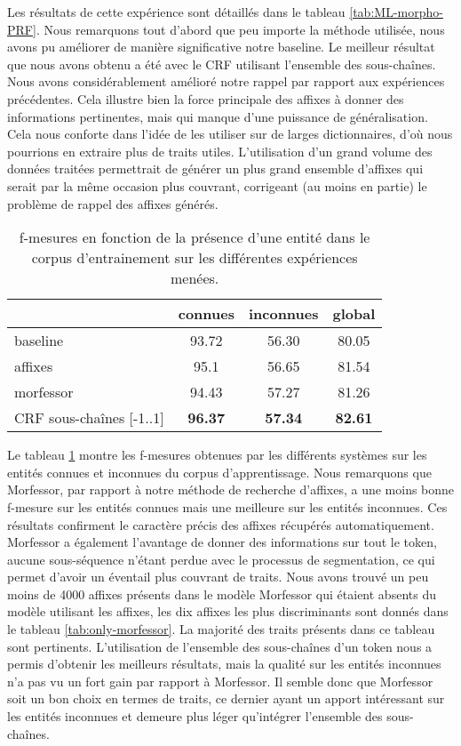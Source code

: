\documentclass[PhD-Yoann-Dupont.tex]{subfiles}
\begin{document}
Les résultats de cette expérience sont détaillés dans le tableau \ref{tab:ML-morpho-PRF}. Nous remarquons tout d'abord que peu importe la méthode utilisée, nous avons pu améliorer de manière significative notre baseline. Le meilleur résultat que nous avons obtenu a été avec le CRF utilisant l'ensemble des sous-chaînes. Nous avons considérablement amélioré notre rappel par rapport aux expériences précédentes. Cela illustre bien la force principale des affixes à donner des informations pertinentes, mais qui manque d'une puissance de généralisation. Cela nous conforte dans l'idée de les utiliser sur de larges dictionnaires, d'où nous pourrions en extraire plus de traits utiles. L'utilisation d'un grand volume des données traitées permettrait de générer un plus grand ensemble d'affixes qui serait par la même occasion plus couvrant, corrigeant (au moins en partie) le problème de rappel des affixes générés.

\begin{table}[ht!]
\centering
\begin{tabular}{|l|ccc|}
\cline{2-4}
\multicolumn{1}{l|}{}      & connues        & inconnues      & global \\
\hline
baseline                   & 93.72          & 56.30          & 80.05 \\
affixes                    & 95.1           & 56.65          & 81.54 \\
morfessor                  & 94.43          & 57.27          & 81.26 \\
CRF sous-chaînes [-1..1] & \textbf{96.37} & \textbf{57.34} & \textbf{82.61} \\
\hline
\end{tabular}
\caption{f-mesures en fonction de la présence d'une entité dans le corpus d'entrainement sur les différentes expériences menées.}
\label{tab:ML-morpho-fscores}
\end{table}

Le tableau \ref{tab:ML-morpho-fscores} montre les f-mesures obtenues par les différents systèmes sur les entités connues et inconnues du corpus d'apprentissage. Nous remarquons que Morfessor, par rapport à notre méthode de recherche d'affixes, a une moins bonne f-mesure sur les entités connues mais une meilleure sur les entités inconnues. Ces résultats confirment le caractère précis des affixes récupérés automatiquement. Morfessor a également l'avantage de donner des informations sur tout le token, aucune sous-séquence n'étant perdue avec le processus de segmentation, ce qui permet d'avoir un éventail plus couvrant de traits. Nous avons trouvé un peu moins de 4000 affixes présents dans le modèle Morfessor qui étaient absents du modèle utilisant les affixes, les dix affixes les plus discriminants sont donnés dans le tableau \ref{tab:only-morfessor}. La majorité des traits présents dans ce tableau sont pertinents. L'utilisation de l'ensemble des sous-chaînes d'un token nous a permis d'obtenir les meilleurs résultats, mais la qualité sur les entités inconnues n'a pas vu un fort gain par rapport à Morfessor. Il semble donc que Morfessor soit un bon choix en termes de traits, ce dernier ayant un apport intéressant sur les entités inconnues et demeure plus léger qu'intégrer l'ensemble des sous-chaînes.
\end{document}

